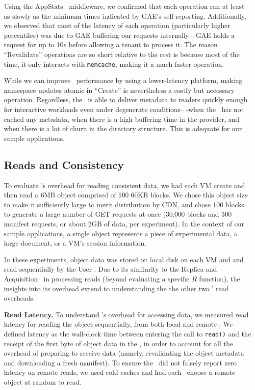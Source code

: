 Using the AppStats~\cite{gae-appstats} middleware,
we confirmed that each operation ran
at least as slowly as the minimum
times indicated by GAE's self-reporting.
Additionally, we observed that most of the latency of each
operation (particularly higher percentiles) was due to GAE buffering our 
requests internally---GAE holds a request for up to 
10s before allowing a tenant to process it.  The reason
``Revalidate'' operations are so short relative to the 
rest is because most of the time, it only interacts with 
{\tt memcache}, making it a much faster operation.

While we can improve \MS\ performance by using a lower-latency platform,
making namespace updates atomic in ``Create'' is
nevertheless a costly but necessary operation.
Regardless, the \MS\ is able to deliver metadata 
to readers quickly enough for interactive workloads even under 
degenerate conditions-- -when the \SG\ has not 
cached any metadata, when there is a high buffering time in the provider,
and when there is a lot of churn in the directory structure.
This is adequate for our sample applications.

\subsection{Reads and Consistency}

To evaluate \Syndicate's overhead for reading consistent data,
we had each VM create and then read a 6MB object
comprised of 100 60KB blocks.
We chose this object size to make it sufficiently 
large to merit distribution by CDN, and chose 100 blocks 
to generate a large number of GET requests at once (30,000 blocks and 300 manifest 
requests, or about 2GB of data, per experiment).  In the context of our sample applications,
a single object represents a piece of experimental data, a large document, or
a VM's session information.

In these experiments, object data was stored on local
disk on each VM and and read sequentially by the User \SG.  Due to
its similarity to
the Replica and Acquisition \SGs\ in
processing reads (beyond evaluating a specific $R$ function), the 
insights into its overhead extend to understanding
the the other two \SGs' read overheads.

{\bf Read Latency.} To understand \Syndicate's overhead for accessing data,
we measured read latency for reading the object sequentially, from
both local and remote \SGs.  We defined latency as the wall-clock time between 
entering the call to {\tt read()} and the receipt of the first byte 
of object data in the \SG, in order to account for all the overhead of 
preparing to receive data (namely, revalidating the object metadata and 
downloading a fresh manifest).  To ensure the \SG\ did not falsely
report zero latency on remote reads, we used cold caches and had each \SG\ choose a
remote object at random to read.

